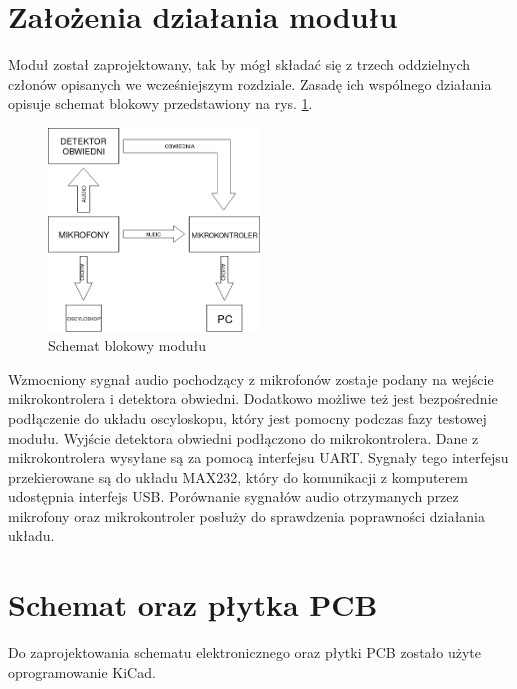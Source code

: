 \documentclass[eng,printmode]{mgr}
\begin{document}
 \section{Założenia działania modułu}
  Moduł został zaprojektowany, tak by mógł składać się z trzech oddzielnych członów opisanych we wcześniejszym rozdziale. Zasadę ich wspólnego działania opisuje schemat blokowy przedstawiony na rys. \ref{fig-schematblokowy}.
  \begin{figure}[!ht]

    \centering

  \includegraphics[width=0.5\textwidth, angle=0]{diagram.png}

    \caption{Schemat blokowy modułu}
 \label{fig-schematblokowy}
    

\end{figure}
%
Wzmocniony sygnał audio pochodzący z mikrofonów zostaje podany na wejście mikrokontrolera i detektora obwiedni. Dodatkowo możliwe też jest bezpośrednie podłączenie do układu oscyloskopu, który jest pomocny podczas fazy testowej modułu. Wyjście detektora obwiedni podłączono do mikrokontrolera. Dane z mikrokontrolera wysyłane są za pomocą interfejsu UART. Sygnały tego interfejsu przekierowane są do układu MAX232, który do komunikacji z komputerem udostępnia interfejs USB. Porównanie sygnałów audio otrzymanych przez mikrofony oraz mikrokontroler posłuży do sprawdzenia poprawności działania układu. 
\section{Schemat oraz płytka PCB}
Do zaprojektowania schematu elektronicznego oraz płytki PCB zostało użyte oprogramowanie KiCad.
\end{document}
